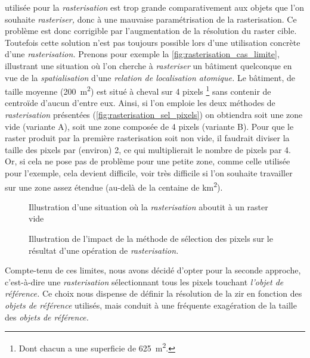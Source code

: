 utilisée pour la \emph{rasterisation} est trop grande comparativement
aux objets que l'on souhaite \emph{rasteriser,} donc à une mauvaise
paramétrisation de la rasterisation. Ce problème est donc corrigible
par l'augmentation de la résolution du raster cible. Toutefois cette
solution n'est pas toujours possible lors d'une utilisation concrète
d'une \emph{rasterisation.} Prenons pour exemple la
\autoref{fig:rasterisation_cas_limite}, illustrant une situation où
l'on cherche à \emph{rasteriser} un bâtiment quelconque en vue de la
\emph{spatialisation} d'une \emph{relation de localisation atomique.}
Le bâtiment, de taille moyenne (\ie \SI{200}{\metre\squared}) est
situé à cheval sur 4 pixels \footnote{Dont chacun a une superficie de
  \SI{625}{\metre\squared}.} sans contenir de centroïde d'aucun
d'entre eux. Ainsi, si l'on emploie les deux méthodes de
\emph{rasterisation} présentées
(\autoref{fig:rasterisation_sel_pixels}) on obtiendra soit une zone
vide (variante \textcolor{RdBu-9-1}{\textsf{A}}), soit une zone
composée de 4 pixels (variante \textcolor{RdBu-9-9}{\textsf{B}}). Pour
que le raster produit par la première rasterisation soit non vide, il
faudrait diviser la taille des pixels par (environ) 2, ce qui
multiplierait le nombre de pixels par 4. Or, si cela ne pose pas de
problème pour une petite zone, comme celle utilisée pour l'exemple,
cela devient difficile, voir très difficile si l'on souhaite
travailler sur une zone assez étendue (au-delà de la centaine de
\si{\kilo\meter\squared}).

\begin{figure}
  \centering
  
  \caption{Illustration d'une situation où la \emph{rasterisation}
    aboutit à un raster vide}
  \label{fig:rasterisation_cas_limite}
\end{figure}

\begin{figure}
  \centering
  
  \caption{Illustration de l'impact de la méthode de sélection des
    pixels sur le résultat d'une opération de \emph{rasterisation.}}
  \label{fig:rasterisation_sel_pixels}
\end{figure}

Compte-tenu de ces limites, nous avons décidé d'opter pour la seconde
approche, c'est-à-dire une \emph{rasterisation} sélectionnant tous les
pixels touchant \emph{l'objet de référence.} Ce choix nous dispense de
définir la résolution de la \ac{zir} en fonction des \emph{objets de
  référence} utilisés, mais conduit à une fréquente exagération de la
taille des \emph{objets de référence.}

